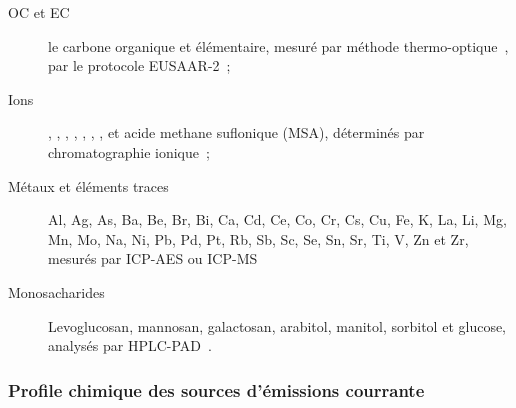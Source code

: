 \begin{description}
    \item[OC et EC] le carbone organique et élémentaire, mesuré par méthode
        thermo-optique~\autocite[Sunset Lab. Analyser]{birchElemental1996}, par le
        protocole EUSAAR-2~\autocite{cavalliStandardised2010,cenAmbient2017a};

    \item[Ions] , , , , , ,
        ,  et acide methane suflonique (MSA), déterminés par
        chromatographie ionique~\autocite{jaffrezoSeasonal2005,cenAmbient2017b};

    \item[Métaux et éléments traces] Al, Ag, As, Ba, Be, Br, Bi, Ca, Cd, Ce, Co, Cr, Cs,
        Cu, Fe, K, La, Li, Mg, Mn, Mo, Na, Ni, Pb, Pd, Pt, Rb, Sb, Sc, Se, Sn, Sr, Ti, V,
        Zn et Zr, mesurés par ICP-AES ou
        ICP-MS~\autocite{allemanPM102010,mbengueSizedistributed2014,cenAmbient2005}

    \item[Monosacharides] Levoglucosan, mannosan, galactosan, arabitol, manitol, sorbitol
        et glucose, analysés par
        HPLC-PAD~\autocite{piotQuantification2012,wakedSource2014}.

\end{description}

\subsubsection{Profile chimique des sources d'émissions courrante}%
\label{ssub:profile_chimique_des_sources_d_émissions_courrante}

